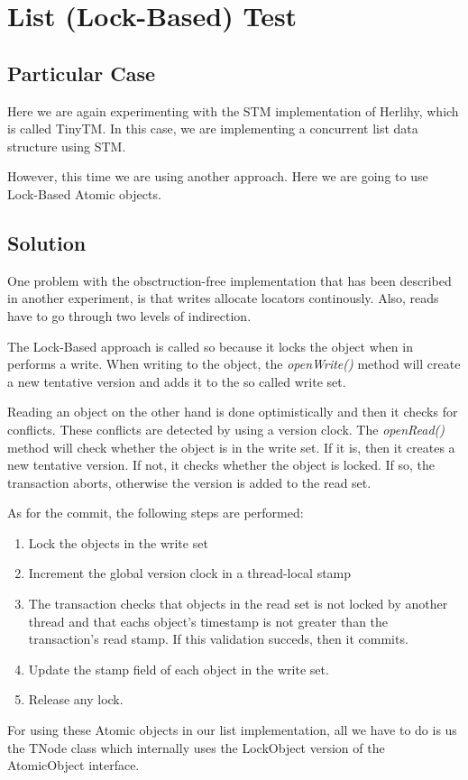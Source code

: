 \section{\textbf{List (Lock-Based) Test}}
\subsection{Particular Case}
\par
Here we are again experimenting with the STM implementation of Herlihy, which is
called TinyTM. In this case, we are implementing a concurrent list data
structure using STM. 
\par
However, this time we are using another approach. Here we are going to use
Lock-Based Atomic objects.
\par
\subsection{Solution}
\par
One problem with the obsctruction-free implementation that has been described in
another experiment, is that writes allocate locators continously. Also, reads
have to go through two levels of indirection. 
\par
The Lock-Based approach is called so because it locks the object when in
performs a write. When writing to the object, the \textit{openWrite()} method
will create a new tentative version and adds it to the so called write set.
\par
Reading an object on the other hand is done optimistically and then it checks
for conflicts. These conflicts are detected by using a version clock. The
\textit{openRead()} method will check whether the object is in the write set. If
it is, then it creates a new tentative version. If not, it checks whether the
object is locked. If so, the transaction aborts, otherwise the version is added
to the read set.
\par
As for the commit, the following steps are performed:
\par
\begin{enumerate}
\item Lock the objects in the write set
\item Increment the global version clock in a thread-local stamp
\item The transaction checks that objects in the read set is not locked by
another thread and that eachs object's timestamp is not greater than the
transaction's read stamp. If this validation succeds, then it commits.
\item Update the stamp field of each object in the write set.
\item Release any lock.
\end{enumerate}
\par
For using these Atomic objects in our list implementation, all we have to do is
us the TNode class which internally uses the LockObject version of the
AtomicObject interface.
\par
